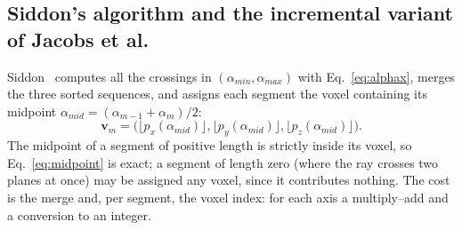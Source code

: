 \documentclass[11pt,a4paper]{article}
\theoremstyle{remark}
\begin{document}
\subsection{Siddon's algorithm and the incremental variant of Jacobs et al.}
\label{sec:algos}

Siddon~\cite{siddon1985fast} computes all the crossings in $(\alpha_{min},\alpha_{max})$ with
Eq.~\eqref{eq:alphax}, merges the three sorted sequences, and assigns each segment the voxel containing
its midpoint $\alpha_{mid}=(\alpha_{m-1}+\alpha_m)/2$:
\begin{equation}
\mathbf{v}_m=\big(\lfloor p_x(\alpha_{mid})\rfloor,\lfloor p_y(\alpha_{mid})\rfloor,
\lfloor p_z(\alpha_{mid})\rfloor\big). \label{eq:midpoint}
\end{equation}
The midpoint of a segment of positive length is strictly inside its voxel, so Eq.~\eqref{eq:midpoint}
is exact; a segment of length zero (where the ray crosses two planes at once) may be assigned any
voxel, since it contributes nothing. The cost is the merge and, per segment, the voxel index: for each
axis a multiply--add and a conversion to an integer.
\end{document}
